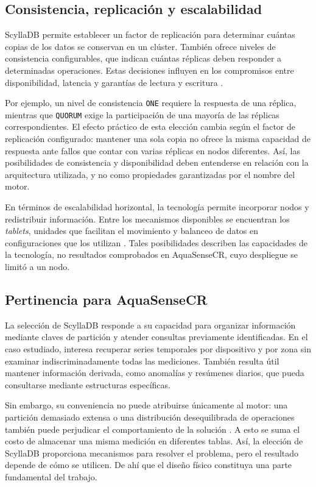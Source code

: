 \documentclass[conference]{IEEEtran}
\begin{document}
\subsection{Consistencia, replicación y escalabilidad}

ScyllaDB permite establecer un factor de replicación para determinar cuántas copias de los datos se conservan en un clúster. También ofrece niveles de consistencia configurables, que indican cuántas réplicas deben responder a determinadas operaciones. Estas decisiones influyen en los compromisos entre disponibilidad, latencia y garantías de lectura y escritura \cite{scylla_rep,scylla_cons}.

Por ejemplo, un nivel de consistencia \texttt{ONE} requiere la respuesta de una réplica, mientras que \texttt{QUORUM} exige la participación de una mayoría de las réplicas correspondientes. El efecto práctico de esta elección cambia según el factor de replicación configurado: mantener una sola copia no ofrece la misma capacidad de respuesta ante fallos que contar con varias réplicas en nodos diferentes. Así, las posibilidades de consistencia y disponibilidad deben entenderse en relación con la arquitectura utilizada, y no como propiedades garantizadas por el nombre del motor.

En términos de escalabilidad horizontal, la tecnología permite incorporar nodos y redistribuir información. Entre los mecanismos disponibles se encuentran los \textit{tablets}, unidades que facilitan el movimiento y balanceo de datos en configuraciones que los utilizan \cite{scylla_tablets}. Tales posibilidades describen las capacidades de la tecnología, no resultados comprobados en AquaSenseCR, cuyo despliegue se limitó a un nodo.

\subsection{Pertinencia para AquaSenseCR}

La selección de ScyllaDB responde a su capacidad para organizar información mediante claves de partición y atender consultas previamente identificadas. En el caso estudiado, interesa recuperar series temporales por dispositivo y por zona sin examinar indiscriminadamente todas las mediciones. También resulta útil mantener información derivada, como anomalías y resúmenes diarios, que pueda consultarse mediante estructuras específicas.

Sin embargo, su conveniencia no puede atribuirse únicamente al motor: una partición demasiado extensa o una distribución desequilibrada de operaciones también puede perjudicar el comportamiento de la solución \cite{scylla_cql}. A esto se suma el costo de almacenar una misma medición en diferentes tablas. Así, la elección de ScyllaDB proporciona mecanismos para resolver el problema, pero el resultado depende de cómo se utilicen. De ahí que el diseño físico constituya una parte fundamental del trabajo.
\end{document}
